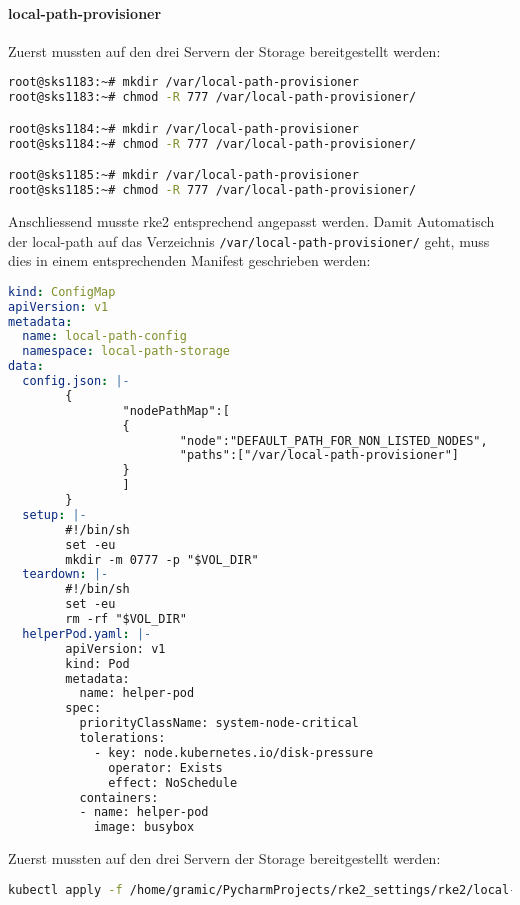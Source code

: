 \paragraph{local-path-provisioner}
Zuerst mussten auf den drei Servern der Storage bereitgestellt werden:
\lstset{style=gra_codestyle}
\begin{lstlisting}[language=bash, caption=local-path-storage auf Linux Bereitstellen,captionpos=b,label={lst:local-path-storage-provide},breaklines=true]
root@sks1183:~# mkdir /var/local-path-provisioner
root@sks1183:~# chmod -R 777 /var/local-path-provisioner/

root@sks1184:~# mkdir /var/local-path-provisioner
root@sks1184:~# chmod -R 777 /var/local-path-provisioner/

root@sks1185:~# mkdir /var/local-path-provisioner
root@sks1185:~# chmod -R 777 /var/local-path-provisioner/
\end{lstlisting}

Anschliessend musste rke2 entsprechend angepasst werden.
Damit Automatisch der local-path auf das Verzeichnis \texttt{/var/local-path-provisioner/} geht, muss dies in einem entsprechenden Manifest geschrieben werden:
\lstset{style=gra_codestyle}
\begin{lstlisting}[language=yaml, caption=local-path-provisioner definieren,captionpos=b,label={lst:local-path-provisioner.yaml},breaklines=true]
kind: ConfigMap
apiVersion: v1
metadata:
  name: local-path-config
  namespace: local-path-storage
data:
  config.json: |-
        {
                "nodePathMap":[
                {
                        "node":"DEFAULT_PATH_FOR_NON_LISTED_NODES",
                        "paths":["/var/local-path-provisioner"]
                }
                ]
        }
  setup: |-
        #!/bin/sh
        set -eu
        mkdir -m 0777 -p "$VOL_DIR"
  teardown: |-
        #!/bin/sh
        set -eu
        rm -rf "$VOL_DIR"
  helperPod.yaml: |-
        apiVersion: v1
        kind: Pod
        metadata:
          name: helper-pod
        spec:
          priorityClassName: system-node-critical
          tolerations:
            - key: node.kubernetes.io/disk-pressure
              operator: Exists
              effect: NoSchedule
          containers:
          - name: helper-pod
            image: busybox
\end{lstlisting}


Zuerst mussten auf den drei Servern der Storage bereitgestellt werden:
\lstset{style=gra_codestyle}
\begin{lstlisting}[language=bash, caption=local-path-storage aktualisieren,captionpos=b,label={lst:local-path-storage-apply},breaklines=true]
kubectl apply -f /home/gramic/PycharmProjects/rke2_settings/rke2/local-path-provisioner.yaml
\end{lstlisting}

